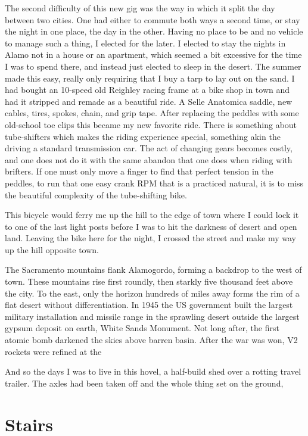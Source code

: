 \documentclass[ebook, 10pt, openright, onecolumn]{memoir}
\newlength{\drop}
\newcommand*\td[1]{
  \todo[inline]{
     #1 
  }
}
\newcommand*\finish{\td{ ----- Finish this section -----}}
\begin{document}
The second difficulty of this new gig was the way in which it split the day
between two cities.  One had either to commute both ways a second time, or stay
the night in one place, the day in the other.  Having no place to be and no
vehicle to manage such a thing, I elected for the later.  I elected to stay the
nights in Alamo not in a house or an apartment, which seemed a bit excessive for
the time I was to spend there, and instead just elected to sleep in the desert.
The summer made this easy, really only requiring that I buy a tarp to lay out on
the sand.  I had bought an 10-speed old Reighley racing frame at a bike shop in
town and had it stripped and remade as a beautiful ride.  A Selle Anatomica
saddle, new cables, tires, spokes, chain, and grip tape.  After replacing the
peddles with some old-school toe clips this became my new favorite ride.  There
is something about tube-shifters which makes the riding experience special,
something akin the driving a standard transmission car.  The act of changing
gears becomes costly, and one does not do it with the same abandon that one does
when riding with brifters.  If one must only move a finger to find that perfect
tension in the peddles, to run that one easy crank RPM that is a practiced
natural, it is to miss the beautiful complexity of the tube-shifting bike.

This bicycle would ferry me up the hill to the edge of town where I could lock
it to one of the last light posts before I was to hit the darkness of desert and
open land.  Leaving the bike here for the night, I crossed the street and
make my way up the hill opposite town.

The Sacramento mountains flank Alamogordo, forming a backdrop to the west of
town.  These mountains rise first roundly, then starkly five thousand feet above
the city.  To the east, only the horizon hundreds of miles away forms the rim of
a flat desert without differentiation.  In 1945 the US government built the
largest military installation and missile range in the sprawling desert outside
the largest gypsum deposit on earth, White Sands Monument.  Not long after,
the first atomic bomb darkened the skies above barren basin. After the war
was won, V2 rockets were refined at the
\finish

And so the days I was to live in this hovel, a half-build shed over a rotting
travel trailer.  The axles had been taken off and the whole thing set on the
ground, 


\chapter{Stairs}
\label{cha:stairs}
\end{document}
